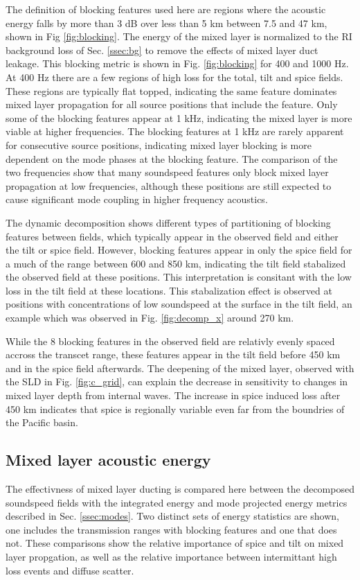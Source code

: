 \documentclass[preprint,NumberedRefs]{JASA}
\begin{document}
The definition of blocking features used here are regions where the acoustic energy falls by more than 3 dB over less than 5 km between 7.5 and 47 km, shown in Fig \ref{fig:blocking}. The energy of the mixed layer is normalized to the RI background loss of Sec. \ref{ssec:bg} to remove the effects of mixed layer duct leakage. This blocking metric is shown in Fig. \ref{fig:blocking} for 400 and 1000 Hz. At 400 Hz there are a few regions of high loss for the total, tilt and spice fields. These regions are typically flat topped, indicating the same feature dominates mixed layer propagation for all source positions that include the feature. Only some of the blocking features appear at 1 kHz, indicating the mixed layer is more viable at higher frequencies. The blocking features at 1 kHz are rarely apparent for consecutive source positions, indicating mixed layer blocking is more dependent on the mode phases at the blocking feature. The comparison of the two frequencies show that many soundspeed features only block mixed layer propagation at low frequencies, although these positions are still expected to cause significant mode coupling in higher frequency acoustics.

The dynamic decomposition shows different types of partitioning of blocking features between fields, which typically appear in the observed field and either the tilt or spice field. However, blocking features appear in only the spice field for a much of the range between 600 and 850 km, indicating the tilt field stabalized the observed field at these positions. This interpretation is consitant with the low loss in the tilt field at these locations. This stabalization effect is observed at positions with concentrations of low soundspeed at the surface in the tilt field, an example which was observed in Fig. \ref{fig:decomp_x} around 270 km.

While the 8 blocking features in the observed field are relativly evenly spaced accross the transcet range, these features appear in the tilt field before 450 km and in the spice field afterwards. The deepening of the mixed layer, observed with the SLD in Fig. \ref{fig:c_grid}, can explain the decrease in sensitivity to changes in mixed layer depth from internal waves. The increase in spice induced loss after 450 km indicates that spice is regionally variable even far from the boundries of the Pacific basin.

\subsection{Mixed layer acoustic energy}
The effectivness of mixed layer ducting is compared here between the decomposed soundspeed fields with the integrated energy and mode projected energy metrics described in Sec. \ref{ssec:modes}. Two distinct sets of energy statistics are shown, one includes the transmission ranges with blocking features and one that does not. These comparisons show the relative importance of spice and tilt on mixed layer propgation, as well as the relative importance between intermittant high loss events and diffuse scatter.
\end{document}
